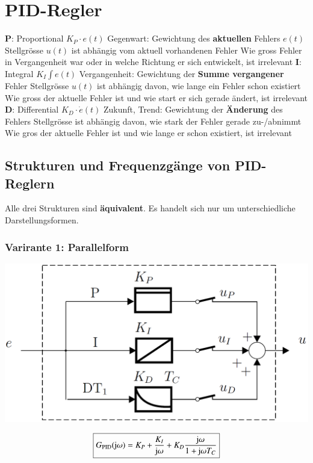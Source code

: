 \section{PID-Regler}

\begin{outline}
    \1 \textbf{P}: Proportional $K_P \cdot e(t)$
        \2 Gegenwart: Gewichtung des \textbf{aktuellen} Fehlers $e(t)$
            \3 Stellgrösse $u(t)$ ist abhängig vom aktuell vorhandenen Fehler
            \3 Wie gross Fehler in Vergangenheit war oder in welche Richtung er sich entwickelt, ist irrelevant
    \1 \textbf{I}: Integral $K_I \int e(t)$
        \2 Vergangenheit: Gewichtung der \textbf{Summe vergangener} Fehler
            \3  Stellgrösse $u(t)$ ist abhängig davon, wie lange ein Fehler schon existiert
            \3 Wie gross der aktuelle Fehler ist und wie start er sich gerade ändert, ist irrelevant
    \1 \textbf{D}: Differential $K_D \cdot \dot{e}(t)$
        \2 Zukunft, Trend: Gewichtung der \textbf{Änderung} des Fehlers
            \3 Stellgrösse ist abhängig davon, wie stark der Fehler gerade zu-/abnimmt
            \3 Wie gros der aktuelle Fehler ist und wie lange er schon existiert, ist irrelevant
\end{outline}


\subsection{Strukturen und Frequenzgänge von PID-Reglern}
\label{Strukturen PID-Regler}

Alle drei Strukturen sind \textbf{äquivalent}. Es handelt sich nur um unterschiedliche Darstellungsformen.


\subsubsection{Varirante 1: Parallelform}
\label{PID-Regler Parallelform}

\begin{minipage}[c]{0.4\columnwidth}
    \includegraphics[width=\columnwidth]{images/pid_regler_aufbau.png}
\end{minipage}
\hfill
\begin{minipage}[c]{0.48\columnwidth}
    $$ \boxed{ G_{\rm PID}(\mathrm{j} \omega) = K_P + \frac{K_I}{\mathrm{j} \omega} + K_D \frac{\mathrm{j} \omega}{1 + \mathrm{j} \omega T_C} } $$
\end{minipage}


